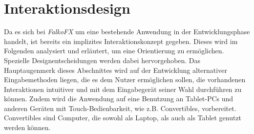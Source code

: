 \chapter{Interaktionsdesign}
Da es sich bei \textit{FalkoFX} um eine bestehende Anwendung in der Entwicklungsphase handelt, ist bereits ein implizites Interaktionskonzept gegeben. Dieses wird im Folgenden analysiert und erläutert, um eine Orientierung zu ermöglichen. Spezielle Designentscheidungen werden dabei hervorgehoben. Das Hauptaugenmerk dieses Abschnittes wird auf der Entwicklung alternativer Eingabemethoden liegen, die es dem Nutzer ermöglichen sollen, die vorhandenen Interaktionen intuitiver und mit dem Eingabegerät seiner Wahl durchführen zu können. Zudem wird die Anwendung auf eine Benutzung an Tablet-PCs und anderen Geräten mit Touch-Bedienbarkeit, wie z.B. Convertibles, vorbereitet. Convertibles sind Computer, die sowohl als Laptop, als auch als Tablet genutzt werden können.\par
